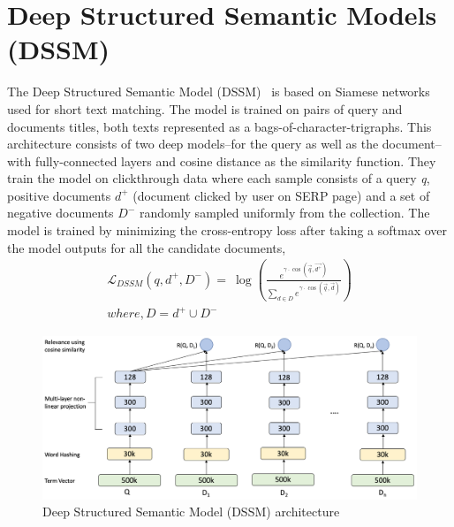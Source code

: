 \section{Deep Structured Semantic Models (DSSM)}
The Deep Structured Semantic Model (DSSM)~\citep{dssm13} is based on Siamese networks used for short text matching. The model is trained on pairs of query and documents titles, both texts represented as a bags-of-character-trigraphs. This architecture consists of two deep models--for the query as well as the document--with fully-connected layers and cosine distance as the similarity function. They train the model on clickthrough data where each sample consists of a query \textit{q}, positive documents $d^{+}$ (document clicked by user on SERP page) and a set of negative documents $D^{-}$ randomly sampled uniformly from the collection. The model is trained by minimizing the cross-entropy loss after taking a softmax over the model outputs for all the candidate documents,
\begin{equation}
\begin{split}
	\mathcal{L}_{DSSM}(q,d^+,D^-) = \
    {\log (\frac{e^{\gamma \cdot \cos (\vec{q},\vec{d^+})}}{\sum_{d \in D}e^{\gamma \cdot \cos (\vec{q},\vec{d})}})} \\
    where, D = {d^+} \cup D^-
\end{split}    
\end{equation}
\begin{figure}
    \centering
    \includegraphics[width=12cm]{Figures/dssm_ppt.png}
    \caption{Deep Structured Semantic Model (DSSM) architecture
    }
    \label{fig:dssm_architecture}
\end{figure}

